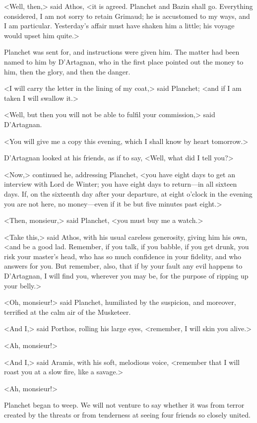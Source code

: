 <Well, then,> said Athos, <it is agreed. Planchet and Bazin shall go. Everything considered, I am not sorry to retain Grimaud; he is accustomed to my ways, and I am particular. Yesterday's affair must have shaken him a little; his voyage would upset him quite.> 

Planchet was sent for, and instructions were given him. The matter had been named to him by D'Artagnan, who in the first place pointed out the money to him, then the glory, and then the danger. 

<I will carry the letter in the lining of my coat,> said Planchet; <and if I am taken I will swallow it.> 

<Well, but then you will not be able to fulfil your commission,> said D'Artagnan. 

<You will give me a copy this evening, which I shall know by heart tomorrow.> 

D'Artagnan looked at his friends, as if to say, <Well, what did I tell you?> 

<Now,> continued he, addressing Planchet, <you have eight days to get an interview with Lord de Winter; you have eight days to return—in all sixteen days. If, on the sixteenth day after your departure, at eight o'clock in the evening you are not here, no money—even if it be but five minutes past eight.> 

<Then, monsieur,> said Planchet, <you must buy me a watch.> 

<Take this,> said Athos, with his usual careless generosity, giving him his own, <and be a good lad. Remember, if you talk, if you babble, if you get drunk, you risk your master's head, who has so much confidence in your fidelity, and who answers for you. But remember, also, that if by your fault any evil happens to D'Artagnan, I will find you, wherever you may be, for the purpose of ripping up your belly.> 

<Oh, monsieur!> said Planchet, humiliated by the suspicion, and moreover, terrified at the calm air of the Musketeer. 

<And I,> said Porthos, rolling his large eyes, <remember, I will skin you alive.> 

<Ah, monsieur!> 

<And I,> said Aramis, with his soft, melodious voice, <remember that I will roast you at a slow fire, like a savage.> 

<Ah, monsieur!> 

Planchet began to weep. We will not venture to say whether it was from terror created by the threats or from tenderness at seeing four friends so closely united. 

